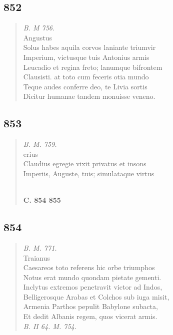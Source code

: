 \documentclass[11pt, a4paper]{report}
\begin{document}
            \subsection*{852}
      \begin{verse}
      \textit{B. M 756.} \\ Angustus \\ Solus habes aquila corvos laniante triumvir \\ Imperium, victusque tuis Antonius armis \\ Leucadio et regina freto; lanumque bifrontem \\ Clausisti. at toto cum feceris otia mundo \\ Teque audes conferre deo, te Livia sortis \\ Dicitur humanae  \lbrack tandem \rbrack  monuisse veneno. \\ 
      \end{verse}
  
            \subsection*{853}
      \begin{verse}
      \textit{B. M. 759.} \\ erius \\ Claudius egregie vixit privatus et insons \\ Imperiis, Auguste, tuis; simulataque virtus \\ 
        ﻿\pagebreak 
     \marginpar{[309]} \begin{center} \textbf{C. 854 855} \end{center}
      \end{verse}
  
            \subsection*{854}
      \begin{verse}
      \textit{B. M. 771.} \\ Traianus \\ Caesareos toto referens hic orbe triumphos \\ Notus erat mundo quondam pietate gementi. \\ Inclytus extremos penetravit victor ad Indos, \\ Belligerosque Arabas et Colchos sub iuga misit, \\ Armenia Parthos pepulit Babylone subacta, \\ Et dedit Albanis regem, quos vicerat armis. \\ \textit{B. II 64. M. 754.} \\ 
      \end{verse}
  
\end{document}
